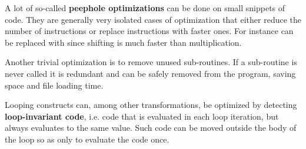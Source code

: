 A lot of so-called \textbf{peephole optimizations} can be done on small snippets
of code. They are generally very isolated cases of optimization that either
reduce the number of instructions or replace instructions with faster ones. For
instance  can be replaced with  since shifting is
much faster than multiplication.

Another trivial optimization is to remove unused sub-routines. If a sub-routine
is never called it is redundant and can be safely removed from the program,
saving space and file loading time.

Looping constructs can, among other transformations, be optimized by detecting
\textbf{loop-invariant code}, i.e. code that is evaluated in each loop
iteration, but always evaluates to the same value. Such code can be moved
outside the body of the loop so as only to evaluate the code once.


